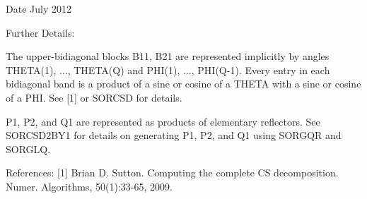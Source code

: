 \begin{DoxyDate}{Date}
July 2012 
\end{DoxyDate}
\begin{DoxyParagraph}{Further Details\+: }
\begin{DoxyVerb}  The upper-bidiagonal blocks B11, B21 are represented implicitly by
  angles THETA(1), ..., THETA(Q) and PHI(1), ..., PHI(Q-1). Every entry
  in each bidiagonal band is a product of a sine or cosine of a THETA
  with a sine or cosine of a PHI. See [1] or SORCSD for details.

  P1, P2, and Q1 are represented as products of elementary reflectors.
  See SORCSD2BY1 for details on generating P1, P2, and Q1 using SORGQR
  and SORGLQ.\end{DoxyVerb}
 
\end{DoxyParagraph}
\begin{DoxyParagraph}{References\+: }
\mbox{[}1\mbox{]} Brian D. Sutton. Computing the complete C\+S decomposition. Numer. Algorithms, 50(1)\+:33-\/65, 2009. 
\end{DoxyParagraph}
